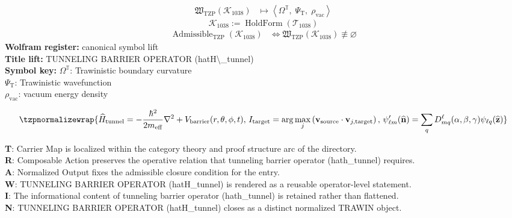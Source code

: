 \noindent
\begin{minipage}[t]{0.48\linewidth}
\begingroup
\small
\[
\begin{aligned}
\mathfrak{W}_{\mathrm{TZP}}\!\left(\mathcal{K}_{1038}\right)
&\longmapsto
\left\langle \Omega^{\mathbb{T}},\; \Psi_{\mathrm{T}},\; \rho_{\mathrm{vac}} \right\rangle
\end{aligned}
\]
\[
\mathcal{K}_{1038}
:=
\operatorname{HoldForm}\!\left(\mathcal{T}_{1038}\right)
\]
\[
\begin{aligned}
\operatorname{Admissible}_{\mathrm{TZP}}\!\left(\mathcal{K}_{1038}\right)
&\Longleftrightarrow
\mathfrak{W}_{\mathrm{TZP}}\!\left(\mathcal{K}_{1038}\right)\not\equiv\varnothing
\end{aligned}
\]
\textbf{Wolfram register:} canonical symbol lift\\
\textbf{Title lift:} TUNNELING BARRIER OPERATOR (hatH\textbackslash{}\_tunnel)\\
\textbf{Symbol key:} \(\Omega^{\mathbb{T}}\): Trawinistic boundary curvature\\ \(\Psi_{\mathrm{T}}\): Trawinistic wavefunction\\ \(\rho_{\mathrm{vac}}\): vacuum energy density
\par
\endgroup
\end{minipage}\hfill
\begin{minipage}[t]{0.48\linewidth}
\[
\tzpnormalizewrap{\widehat{H}_{\mathrm{tunnel}}=-\frac{\hbar^2}{2m_{\mathrm{eff}}}\nabla^2+V_{\mathrm{barrier}}(r,\theta,\phi,t),\,I_{\mathrm{target}}=\arg\max_j\left(\mathbf{v}_{\mathrm{source}}\cdot\mathbf{v}_{j,\mathrm{target}}\right),\,\psi_{\ell m}^{\prime}(\widehat{\mathbf{n}})=\sum_q D_{mq}^{\ell}(\alpha,\beta,\gamma)\psi_{\ell q}(\widehat{\mathbf{z}})}
\]

\small
\textbf{T}: Carrier Map is localized within the category theory and proof structure arc of the directory.\\
\textbf{R}: Composable Action preserves the operative relation that tunneling barrier operator (hath\_tunnel) requires.\\
\textbf{A}: Normalized Output fixes the admissible closure condition for the entry.\\
\textbf{W}: TUNNELING BARRIER OPERATOR (hatH\_tunnel) is rendered as a reusable operator-level statement.\\
\textbf{I}: The informational content of tunneling barrier operator (hath\_tunnel) is retained rather than flattened.\\
\textbf{N}: TUNNELING BARRIER OPERATOR (hatH\_tunnel) closes as a distinct normalized TRAWIN object.
\normalsize
\end{minipage}

